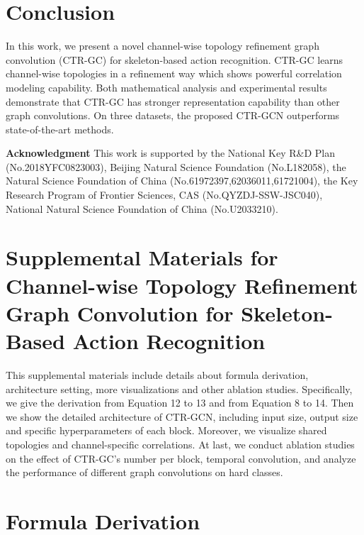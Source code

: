 \documentclass[10pt,twocolumn,letterpaper]{article}
\begin{document}
\section{Conclusion}
In this work, we present a novel channel-wise topology refinement graph convolution (CTR-GC) for skeleton-based action recognition. CTR-GC learns channel-wise topologies in a refinement way which shows powerful correlation modeling capability. Both mathematical analysis and experimental results demonstrate that CTR-GC has stronger representation capability than other graph convolutions. On three datasets, the proposed CTR-GCN outperforms state-of-the-art methods.

\noindent\textbf{Acknowledgment} This work is supported by the National Key R\&D Plan (No.2018YFC0823003), Beijing Natural Science Foundation (No.L182058), the Natural Science Foundation of China (No.61972397,62036011,61721004), the Key Research Program of Frontier Sciences, CAS (No.QYZDJ-SSW-JSC040),  National Natural Science Foundation of China (No.U2033210).

{\small


}

\clearpage
\section*{Supplemental Materials for Channel-wise Topology Refinement Graph Convolution for Skeleton-Based Action Recognition}  

\thispagestyle{empty}


This supplemental materials include details about formula derivation, architecture setting, more visualizations and other ablation studies. Specifically, we give the derivation from Equation {\color{blue}12} to {\color{blue}13} and from Equation {\color{blue}8} to {\color{blue}14}. Then we show the detailed architecture of CTR-GCN, including input size, output size and specific hyperparameters of each block. Moreover, we visualize shared topologies and channel-specific correlations. At last, we conduct ablation studies on the effect of CTR-GC's number per block, temporal convolution, and analyze the performance of different graph convolutions on hard classes.

\section*{Formula Derivation}
\end{document}
